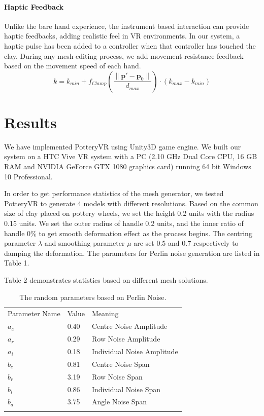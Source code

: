 \documentclass{svjour3}                     %
\begin{document}
\paragraph{Haptic Feedback}
Unlike the bare hand experience, the instrument based interaction can provide haptic feedbacks, adding realistic feel in VR environments. In our system, a haptic pulse has been added to a controller when that controller has touched the clay. During any mesh editing process, we add movement resistance feedback based on the movement speed of each hand.
\begin{equation}
k = k_{min} + f_{Clamp}(\frac{ \| \mathbf{p'} - \mathbf{p}_{0} \|}{d_{max}}) \cdot (k_{max} - k_{min})
\end{equation}


\section{Results}
\label{sec:5}
We have implemented PotteryVR using Unity3D\cite{website:unity} game engine. We built our system on a HTC Vive\cite{website:vive} VR system with a PC (2.10 GHz Dual Core CPU, 16 GB RAM and NVIDIA GeForce GTX 1080 graphics card) running 64 bit Windows 10 Professional.

In order to get performance statistics of the mesh generator, we tested PotteryVR to generate 4 models with different resolutions.
Based on the common size of clay placed on pottery wheels, we set the height 0.2 units with the radius 0.15 units.
We set the outer radius of handle 0.2 units, and the inner ratio of handle 0\% to get smooth deformation effect as the process begins. The centring parameter $\lambda$ and smoothing parameter $\mu$ are set 0.5 and 0.7 respectively to damping the deformation. The parameters for Perlin noise generation are listed in Table 1.

Table 2 demonstrates statistics based on different mesh solutions. 

\begin{table}
\caption{The random parameters based on Perlin Noise.}
\label{tab:1}       %
\begin{tabular}{lll}
\hline\noalign{\smallskip}
Parameter Name & Value & Meaning  \\
\noalign{\smallskip}\hline\noalign{\smallskip}
$a_{c}$ & 0.40 & Centre Noise Amplitude \\
$a_{r}$ & 0.29 & Row Noise Amplitude \\
$a_{i}$ & 0.18 & Individual Noise Amplitude \\
$b_{c}$ & 0.81 & Centre Noise Span \\
$b_{r}$ & 3.19 & Row Noise Span \\
$b_{i}$ & 0.86 & Individual Noise Span \\
$b_{a}$ & 3.75 & Angle Noise Span \\
\noalign{\smallskip}\hline
\end{tabular}
\end{table}
\end{document}
